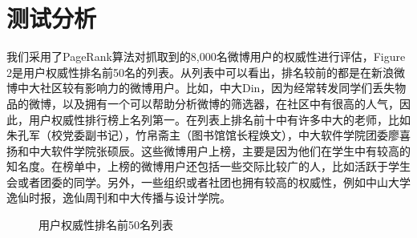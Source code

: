 \documentclass[a4paper]{article}
\begin{document}
\section{测试分析}
我们采用了PageRank算法对抓取到的8,000名微博用户的权威性进行评估，Figure 2是用户权威性排名前50名的列表。从列表中可以看出，排名较前的都是在新浪微博中大社区较有影响力的微博用户。比如，中大Din，因为经常转发同学们丢失物品的微博，以及拥有一个可以帮助分析微博的筛选器，在社区中有很高的人气，因此，用户权威性排行榜上名列第一。在列表上排名前十中有许多中大的老师，比如朱孔军（校党委副书记），竹帛斋主（图书馆馆长程焕文），中大软件学院团委廖喜扬和中大软件学院张硕辰。这些微博用户上榜，主要是因为他们在学生中有较高的知名度。在榜单中，上榜的微博用户还包括一些交际比较广的人，比如活跃于学生会或者团委的同学。另外，一些组织或者社团也拥有较高的权威性，例如中山大学逸仙时报，逸仙周刊和中大传播与设计学院。
\begin{figure}[H]
\centering
{}
\caption{用户权威性排名前50名列表}
\label{fig:2}
\end{figure}
\end{document}
